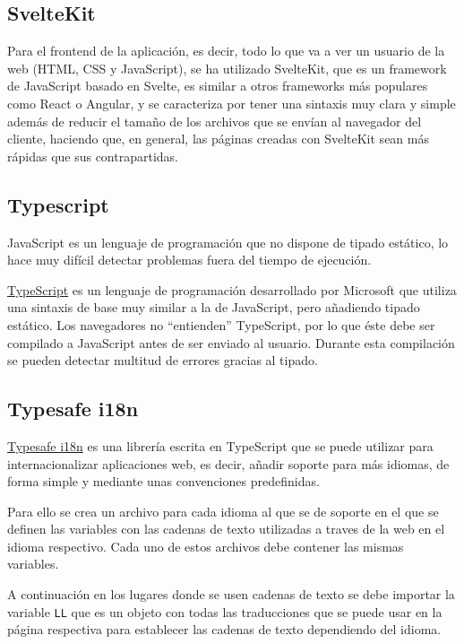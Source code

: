 \subsection{SvelteKit}

Para el frontend de la aplicación, es decir, todo lo que va a ver un usuario de
la web (HTML, CSS y JavaScript), se ha utilizado SvelteKit, que es un framework
de JavaScript basado en Svelte, es similar a otros frameworks más populares como
React o Angular, y se caracteriza por tener una sintaxis muy clara y simple
además de reducir el tamaño de los archivos que se envían al navegador del
cliente, haciendo que, en general, las páginas creadas con SvelteKit sean más
rápidas que sus contrapartidas.

\subsection{Typescript}

JavaScript es un lenguaje de programación que no dispone de tipado estático, lo
hace muy difícil detectar problemas fuera del tiempo de ejecución.

\href{https://www.typescriptlang.org/}{TypeScript} es un lenguaje de
programación desarrollado por Microsoft que utiliza una sintaxis de base muy
similar a la de JavaScript, pero añadiendo tipado estático. Los navegadores no
``entienden'' TypeScript, por lo que éste debe ser compilado a JavaScript antes
de ser enviado al usuario. Durante esta compilación se pueden detectar multitud
de errores gracias al tipado.

\subsection{Typesafe i18n}

\href{https://github.com/ivanhofer/typesafe-i18n}{Typesafe i18n} es una librería
escrita en TypeScript que se puede utilizar para internacionalizar aplicaciones
web, es decir, añadir soporte para más idiomas, de forma simple y mediante unas
convenciones predefinidas.

Para ello se crea un archivo para cada idioma al que se de soporte en el que se
definen las variables con las cadenas de texto utilizadas a traves de la web en
el idioma respectivo. Cada uno de estos archivos debe contener las mismas
variables.

A continuación en los lugares donde se usen cadenas de texto se debe importar la
variable \texttt{LL} que es un objeto con todas las traducciones que se puede
usar en la página respectiva para establecer las cadenas de texto dependiendo
del idioma.

